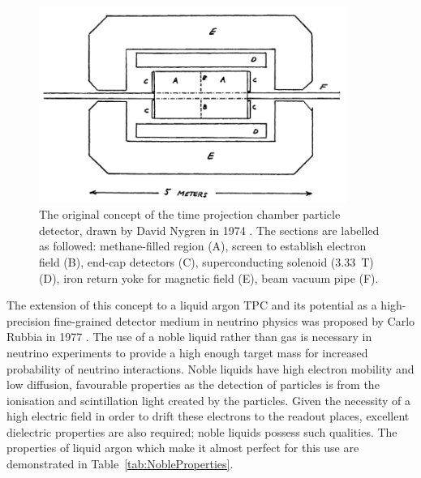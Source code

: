 \begin{figure}
  \centering
  \includegraphics[width=10cm]{NygrenTPC.png}
  \caption[Original TPC design, Nygren (1974)]{The original concept of the time projection chamber particle detector, drawn by David Nygren in 1974 \cite{Nygren1974}.  The sections are labelled as followed: methane-filled region (A), screen to establish electron field (B), end-cap detectors (C), superconducting solenoid (3.33~T) (D), iron return yoke for magnetic field (E), beam vacuum pipe (F).}
  \label{fig:NygrenTPC}
\end{figure}

The extension of this concept to a liquid argon TPC and its potential as a high-precision fine-grained detector medium in neutrino physics was proposed by Carlo Rubbia in 1977 \cite{Rubbia1977}.  The use of a noble liquid rather than gas is necessary in neutrino experiments to provide a high enough target mass for increased probability of neutrino interactions.  Noble liquids have high electron mobility and low diffusion, favourable properties as the detection of particles is from the ionisation and scintillation light created by the particles.  Given the necessity of a high electric field in order to drift these electrons to the readout places, excellent dielectric properties are also required; noble liquids possess such qualities.  The properties of liquid argon which make it almost perfect for this use are demonstrated in Table~\ref{tab:NobleProperties}.

